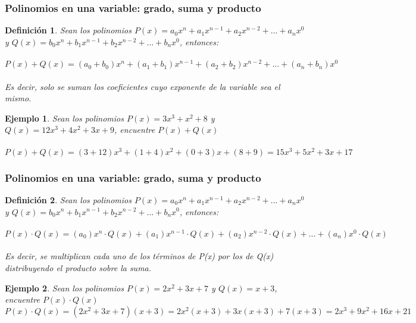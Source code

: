 \documentclass[11pt]{beamer}
\newtheorem{defi}{Definición}
\newtheorem{ejem}{Ejemplo}
\begin{document}
\begin{frame}
\frametitle{Polinomios en una variable: grado, suma y producto}
\begin{defi}
Sean los polinomios $P(x) = a_0x^n + a_1x^{n-1} + a_2x^{n-2} + ... + a_nx^{0}$ y $Q(x) = b_0x^n + b_1x^{n-1} + b_2x^{n-2} + ... + b_nx^{0}$, entonces: \\ \hspace{0cm} \\
$P(x)+Q(x) = (a_0+b_0)x^{n} + (a_1+b_1)x^{n-1} + (a_2+b_2)x^{n-2} + ... + (a_n+b_n)x^{0}$\\ \hspace{0cm} \\
Es decir, solo se suman los coeficientes cuyo exponente de la variable sea el mismo.
\end{defi}
\begin{ejem}
Sean los polinomios $P(x) = 3x^3 + x^2 + 8$ y $Q(x) = 12x^3 + 4x^2 + 3x + 9$, encuentre $P(x)+Q(x)$\\ \hspace{0cm} \\
$P(x)+Q(x) = (3+12)x^3 + (1+4)x^2 + (0+3)x + (8 + 9) = 15x^3 + 5x^2 + 3x + 17$
\end{ejem}
\end{frame}

\begin{frame}
\frametitle{Polinomios en una variable: grado, suma y producto}
\begin{defi}
Sean los polinomios $P(x) = a_0x^n + a_1x^{n-1} + a_2x^{n-2} + ... + a_nx^{0}$ y $Q(x) = b_0x^n + b_1x^{n-1} + b_2x^{n-2} + ... + b_nx^{0}$, entonces: \\ \hspace{0cm} \\
$P(x)\cdot Q(x) = (a_0)x^n\cdot Q(x) + (a_1)x^{n-1}\cdot Q(x) + (a_2)x^{n-2}\cdot Q(x) + ... + (a_n)x^0\cdot Q(x)$\\ \hspace{0cm} \\
Es decir, se multiplican cada uno de los términos de P(x) por los de Q(x) distribuyendo el producto sobre la suma.
\end{defi}
\begin{ejem}
Sean los polinomios $P(x) = 2x^2 + 3x + 7$ y $Q(x) = x + 3$, encuentre $P(x)\cdot Q(x)$ \\
$P(x)\cdot Q(x) = (2x^2 + 3x + 7)(x + 3) = 2x^2(x+3) + 3x(x+3) + 7(x+3) = 2x^3 + 9x^2 + 16x + 21$
\end{ejem}
\end{frame}
\end{document}
